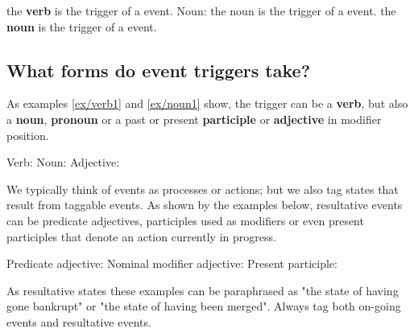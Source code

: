 \begin{exe}
    \ex\label{ex/verb1} 
        \expl the \textbf{verb}  is the trigger of a  event.
    \ex\label{ex/noun1} Noun: 
        \expl the noun  is the trigger of a  event.
    \ex\label{ex/noun2} 
        \expl the \textbf{noun}  is the trigger of a  event.
\end{exe}

\subsection{What forms do event triggers take?}

As examples \ref{ex/verb1} and \ref{ex/noun1} show, the trigger can be a \textbf{verb}, but also a \textbf{noun}, \textbf{pronoun} or a past or present \textbf{participle} or \textbf{adjective} in modifier position.

\begin{exe}
    \ex\label{ex/verb2} Verb: 
    \ex\label{ex/noun2} Noun: 
    \ex\label{ex/adjective} Adjective: 
\end{exe}

We typically think of events as processes or actions; but we also tag states that result from taggable events.
As shown by the examples below, resultative events can be predicate adjectives, participles used as modifiers or even present participles that denote an action currently in progress.

\begin{exe}
    \ex\label{ex/predicateadjective} Predicate adjective: 
    \ex\label{ex/npadjective} Nominal modifier adjective: 
    \ex\label{ex/presentparticiple} Present participle: 
\end{exe}

As resultative states these examples can be paraphrased as "the state of having gone bankrupt" or "the state of having been merged".
Always tag both on-going events and resultative events.

